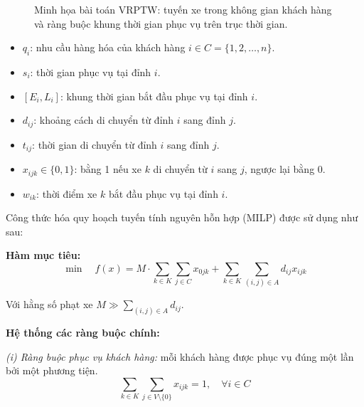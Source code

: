 \documentclass[13pt,a4paper]{extarticle}
\begin{document}
\begin{figure}[H]
{%
}
\caption{Minh họa bài toán VRPTW: tuyến xe trong không gian khách hàng và ràng buộc khung thời gian phục vụ trên trục thời gian.}
\label{fig:vrptw_clean}
\end{figure}
\clearpage
\begin{itemize}[leftmargin=1.2cm]
  \item $q_i$: nhu cầu hàng hóa của khách hàng $i \in C = \{1, 2, \dots, n\}$.
  \item $s_i$: thời gian phục vụ tại đỉnh $i$.
  \item $[E_i, L_i]$: khung thời gian bắt đầu phục vụ tại đỉnh $i$.
  \item $d_{ij}$: khoảng cách di chuyển từ đỉnh $i$ sang đỉnh $j$.
  \item $t_{ij}$: thời gian di chuyển từ đỉnh $i$ sang đỉnh $j$.
  \item $x_{ijk} \in \{0, 1\}$: bằng 1 nếu xe $k$ di chuyển từ $i$ sang $j$, ngược lại bằng 0.
  \item $w_{ik}$: thời điểm xe $k$ bắt đầu phục vụ tại đỉnh $i$.
\end{itemize}

Công thức hóa quy hoạch tuyến tính nguyên hỗn hợp (MILP) được sử dụng như sau:

\textbf{Hàm mục tiêu:}
\begin{equation}
\min \quad f(x) = M \cdot \sum_{k \in K} \sum_{j \in C} x_{0jk} + \sum_{k \in K} \sum_{(i, j) \in A} d_{ij} x_{ijk}
\end{equation}
\vspace{0.12cm}

Với hằng số phạt xe $M \gg \sum_{(i, j) \in A} d_{ij}$.

\textbf{Hệ thống các ràng buộc chính:}

\noindent\textit{(i) Ràng buộc phục vụ khách hàng:} mỗi khách hàng được phục vụ đúng một lần bởi một phương tiện.
\begin{equation}
\sum_{k \in K} \sum_{j \in V \setminus \{0\}} x_{ijk} = 1, \quad \forall i \in C
\end{equation}
\end{document}
